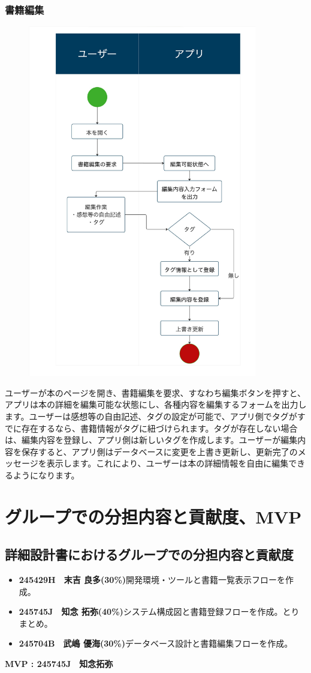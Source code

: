 \documentclass[a4paper, 11pt, titlepage]{jsarticle}
\begin{document}
\subsubsection{書籍編集}
\begin{figure}[h]
\centering
\includegraphics[width=100mm]{flow-henshu.jpg}
\label{fig:func}
\end{figure}

ユーザーが本のページを開き、書籍編集を要求、すなわち編集ボタンを押すと、アプリは本の詳細を編集可能な状態にし、各種内容を編集するフォームを出力します。ユーザーは感想等の自由記述、タグの設定が可能で、アプリ側でタグがすでに存在するなら、書籍情報がタグに紐づけられます。タグが存在しない場合は、編集内容を登録し、アプリ側は新しいタグを作成します。ユーザーが編集内容を保存すると、アプリ側はデータベースに変更を上書き更新し、更新完了のメッセージを表示します。これにより、ユーザーは本の詳細情報を自由に編集できるようになります。

\section{グループでの分担内容と貢献度、MVP}%

\subsection{詳細設計書におけるグループでの分担内容と貢献度}
\begin{itemize}
    \item \textbf{245429H　末吉 良多(30\%)}開発環境・ツールと書籍一覧表示フローを作成。
    \item \textbf{245745J　知念 拓弥(40\%)}システム構成図と書籍登録フローを作成。とりまとめ。
    \item \textbf{245704B　武嶋 優海(30\%)}データベース設計と書籍編集フローを作成。
\end{itemize}

\textbf{MVP : 245745J　知念拓弥}
\end{document}

